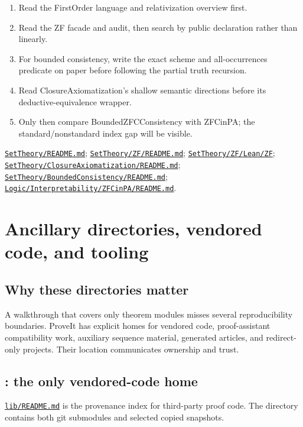 \documentclass[
  10pt,
  a4paper,
  twoside,
  open=any,
  parskip=half,
  headings=big
]{scrreprt}
\newcommand{\CommitFull}{675d0a2ff0fc624fba199e006049016ba806f40a}
\newcommand{\RepoBlobBase}{https://github.com/VladimirReshetnikov/ProveIt/blob/\CommitFull/}
\newcommand{\RepoTreeBase}{https://github.com/VladimirReshetnikov/ProveIt/tree/\CommitFull/}
\newcommand{\RepoFile}[1]{%
  \href{\RepoBlobBase\detokenize{#1}}{\nolinkurl{#1}}}
\newcommand{\RepoDir}[1]{%
  \href{\RepoTreeBase\detokenize{#1}}{\nolinkurl{#1}}}
\newcommand{\code}[1]{\texttt{\detokenize{#1}}}
\begin{document}
\begin{readingbox}
\begin{enumerate}
  \item Read the FirstOrder language and relativization overview first.
  \item Read the ZF facade and audit, then search \code{Zf.lean} by public
        declaration rather than linearly.
  \item For bounded consistency, write the exact scheme and all-occurrences
        predicate on paper before following the partial truth recursion.
  \item Read ClosureAxiomatization's shallow semantic directions before its
        deductive-equivalence wrapper.
  \item Only then compare BoundedZFCConsistency with ZFCinPA; the
        standard/nonstandard index gap will be visible.
\end{enumerate}
\end{readingbox}

\begin{sourcebox}
\RepoFile{SetTheory/README.md};
\RepoFile{SetTheory/ZF/README.md};
\RepoDir{SetTheory/ZF/Lean/ZF};
\RepoFile{SetTheory/ClosureAxiomatization/README.md};
\RepoFile{SetTheory/BoundedConsistency/README.md};
\RepoFile{Logic/Interpretability/ZFCinPA/README.md}.
\end{sourcebox}

\chapter{Ancillary directories, vendored code, and tooling}
\label{chap:ancillary}

\section{Why these directories matter}

A walkthrough that covers only theorem modules misses several reproducibility
boundaries.  ProveIt has explicit homes for vendored code, proof-assistant
compatibility work, auxiliary sequence material, generated articles, and
redirect-only projects.  Their location communicates ownership and trust.

\section{\code{lib}: the only vendored-code home}

\RepoFile{lib/README.md} is the provenance index for third-party proof code.
The directory contains both git submodules and selected copied snapshots.
\end{document}
